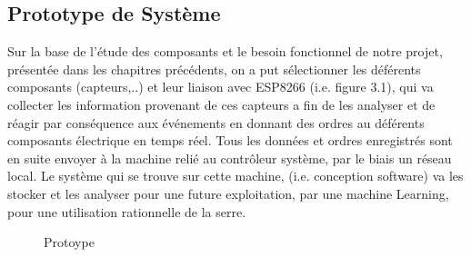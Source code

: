 \subsection{Prototype de Système}
Sur la base de l’étude des composants et le besoin fonctionnel de notre projet, présentée dans les chapitres précédents, on a put sélectionner les déférents composants (capteurs,..) et leur liaison avec ESP8266 (i.e. figure 3.1), qui va collecter les information provenant de ces capteurs a fin de les analyser et de réagir par conséquence  aux événements en donnant des ordres au déférents composants électrique en temps réel. Tous les données et ordres enregistrés sont en suite envoyer à la machine relié au contrôleur  système, par le biais un réseau local. Le système qui se trouve sur cette machine, (i.e. conception software)   va les stocker et les analyser pour une future exploitation, par une machine Learning, pour une utilisation rationnelle de la serre. 
\begin{figure}[hbt]
\right
\label{fig:Prototype}

 \caption{Protoype}
\end{figure}
\newline


